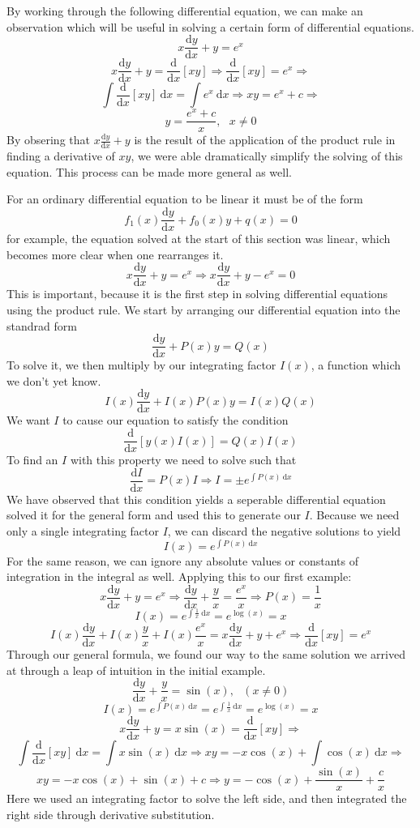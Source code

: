 \documentclass[12pt]{report}
\newcommand{\dx}{\:\mathrm{d}x}
\newcommand{\dd}[2]{\frac{\mathrm{d}#1}{\mathrm{d}#2}}
\newcommand{\mcom}{, \:\:\:}
\newcommand{\derivx}[1]{\frac{\mathrm{d}}{\mathrm{d}x}\left[#1\right]}
\begin{document}
\begin{flushleft}
By working through the following differential equation, we can make an
observation which will be useful in solving a certain form of differential
equations.
\[x\dd{y}{x} + y = e^x\]
\[x\dd{y}{x} + y = \derivx{xy} \Rightarrow \derivx{xy} = e^x \Rightarrow\]
\[\int\derivx{xy}\dx = \int e^x\dx \Rightarrow xy = e^x + c \Rightarrow\]
\[y = \frac{e^x + c}{x}\mcom x\neq0\]
By obsering that \(x\dd{y}{x} + y\) is the result of the application of the
product rule in finding a derivative of \(xy\), we were able dramatically
simplify the solving of this equation. This process can be made more general
as well. \par
For an ordinary differential equation to be linear it must be of the form
\[f_1(x)\dd{y}{x} + f_0(x)y + q(x) = 0\]
for example, the equation solved at the start of this section was linear,
which becomes more clear when one rearranges it. 
\[x\dd{y}{x} + y = e^x \Rightarrow x\dd{y}{x} + y - e^x = 0\]
This is important, because it is the first step in solving differential
equations using the product rule. We start by arranging our differential
equation into the standrad form
\[\dd{y}{x} + P(x)y = Q(x)\]
To solve it, we then multiply by our integrating factor \(I(x)\), a function
which we don't yet know.
\[I(x)\dd{y}{x} + I(x)P(x)y = I(x)Q(x)\]
We want \(I\) to cause our equation to satisfy the condition
\[\derivx{y(x)I(x)} = Q(x)I(x)\]
To find an \(I\) with this property we need to solve such that
\[\dd{I}{x} = P(x)I \Rightarrow I = \pm e^{\int P(x) \dx}\]
We have observed that this condition yields a seperable differential equation
solved it for the general form and used this to generate our \(I\). Because
we need only a single integrating factor \(I\), we can discard the negative
solutions to yield
\[I(x) = e^{\int P(x) \dx}\]
For the same reason, we can ignore any absolute values or constants of
integration in the integral as well. Applying this to our first example:
\[x\dd{y}{x} + y = e^x \Rightarrow \dd{y}{x} + \frac{y}{x} = \frac{e^x}{x}
\Rightarrow P(x) = \frac{1}{x}\]
\[I(x) = e^{\int \frac{1}{x} \dx} = e^{\log(x)} = x\]
\[I(x)\dd{y}{x} + I(x)\frac{y}{x} + I(x)\frac{e^x}{x} = x\dd{y}{x} + y + e^x
\Rightarrow \derivx{xy} = e^x\]
Through our general formula, we found our way to the same solution we arrived
at through a leap of intuition in the initial example.
\[\dd{y}{x} + \frac{y}{x} = \sin(x)\mcom (x\neq 0)\]
\[I(x) = e^{\int P(x) \dx} = e^{\int \frac{1}{x} \dx} = e^{\log(x)} = x\]
\[x\dd{y}{x} + y = x\sin(x) = \derivx{xy} \Rightarrow\]
\[\int \derivx{xy} \dx = \int x\sin(x) \dx \Rightarrow xy 
= -x\cos(x) + \int\cos(x) \dx \Rightarrow\]
\[xy = -x\cos(x) + \sin(x) + c \Rightarrow y 
= -\cos(x) + \frac{\sin(x)}{x} + \frac{c}{x}\]
Here we used an integrating factor to solve the left side, and then integrated
the right side through derivative substitution.


\end{flushleft}
\end{document}
